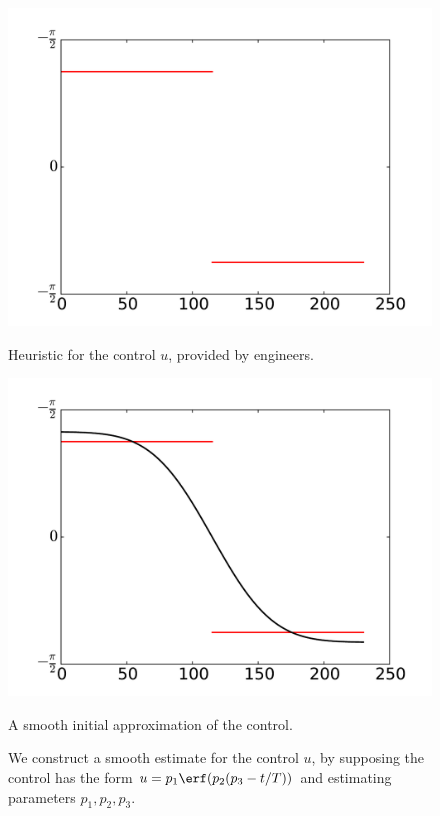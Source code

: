 \begin{figure}
\begin{minipage}[b]{.47\linewidth}
\centering
\includegraphics[width=\textwidth]{u_heuristic.pdf}
\caption*{Heuristic for the control $u$, provided by engineers. }
\end{minipage}
\hspace{0.5cm}
\begin{minipage}[b]{0.47\linewidth}
\centering
\includegraphics[width=\textwidth]{u_heuristic_smooth.pdf}
\caption*{A smooth initial approximation of the control.}
\end{minipage}
\caption{We construct a smooth estimate for the control $u$, by supposing the control has the form 
$u = p_1\erf(p_2(p_3-t/T))$ and estimating parameters $p_1, p_2, p_3$.}
\label{fig:reentry:estimate_u}
\end{figure}


